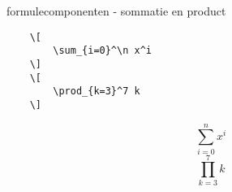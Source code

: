 \begin{frame}[fragile]{formulecomponenten - sommatie en product}
    \begin{verbatim}
    \[
        \sum_{i=0}^\n x^i
    \]
    \[
        \prod_{k=3}^7 k  
    \]
    \end{verbatim}
    \begin{tcolorbox}[width=11cm, size=small]
        \[
            \sum_{i=0}^n x^i
        \]
        \[
            \prod_{k=3}^7 k  
        \]
    \end{tcolorbox}

\end{frame}